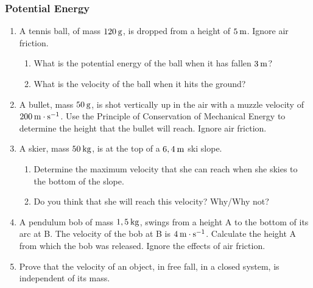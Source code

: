            \subsubsection{ Potential Energy }
            \nopagebreak
            \label{m38786*id70623}\begin{enumerate}[noitemsep, label=\textbf{\arabic*}. ] 
            \label{m38786*uid95}\item A tennis ball, of mass $120\phantom{\rule{2pt}{0ex}}\mathrm{g}$, is dropped from a height of $5\phantom{\rule{2pt}{0ex}}\mathrm{m}$. Ignore air friction.
\label{m38786*id70639}\begin{enumerate}[noitemsep, label=\textbf{\alph*}. ] 
            \label{m38786*uid96}\item What is the potential energy of the ball when it has fallen $3\phantom{\rule{2pt}{0ex}}\mathrm{m}$?
\label{m38786*uid97}\item What is the velocity of the ball when it hits the ground?
\end{enumerate}
                \label{m38786*uid98}\item A bullet, mass $50\phantom{\rule{2pt}{0ex}}\mathrm{g}$, is shot vertically up in the air with a muzzle velocity of $200\phantom{\rule{2pt}{0ex}}\mathrm{m}\ensuremath{\cdot}\mathrm{s}{}^{-1}$. Use the Principle of Conservation of Mechanical Energy to determine the height that the bullet will reach. Ignore air friction.\newline
\label{m38786*uid99}\item A skier, mass $50\phantom{\rule{2pt}{0ex}}\mathrm{kg}$, is at the top of a $6,4\phantom{\rule{2pt}{0ex}}\mathrm{m}$ ski slope.
\label{m38786*id70721}\begin{enumerate}[noitemsep, label=\textbf{\alph*}. ] 
            \label{m38786*uid100}\item Determine the maximum velocity that she can reach when she skies to the bottom of the slope.
\label{m38786*uid101}\item Do you think that she will reach this velocity? Why/Why not?
\end{enumerate}
                \label{m38786*uid102}\item A pendulum bob of mass $1,5\phantom{\rule{2pt}{0ex}}\mathrm{kg}$, swings from a height A to the bottom of its arc at B. The velocity of the bob at B is $4\phantom{\rule{2pt}{0ex}}\mathrm{m}\ensuremath{\cdot}\mathrm{s}{}^{-1}$. Calculate the height A from which the bob was released. Ignore the effects of air friction.\newline
\label{m38786*uid103}\item Prove that the velocity of an object, in free fall, in a closed system, is independent of its mass.\newline
\end{enumerate}
